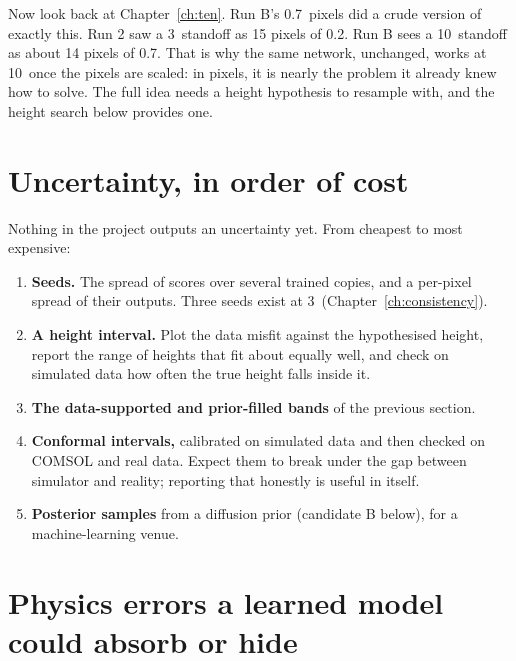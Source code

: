 Now look back at Chapter~\ref{ch:ten}. Run B's 0.7\um\ pixels did a crude version of exactly this. Run 2 saw a 3\um\
standoff as 15 pixels of 0.2\um. Run B sees a 10\um\ standoff as about 14 pixels of 0.7\um. That is why the same network,
unchanged, works at 10\um\ once the pixels are scaled: in pixels, it is nearly the problem it already knew how to solve.
The full idea needs a height hypothesis to resample with, and the height search below provides one.

\section{Uncertainty, in order of cost}

Nothing in the project outputs an uncertainty yet. From cheapest to most expensive:
\begin{enumerate}
\item \textbf{Seeds.} The spread of scores over several trained copies, and a per-pixel spread of their outputs. Three
seeds exist at 3\um\ (Chapter~\ref{ch:consistency}).
\item \textbf{A height interval.} Plot the data misfit against the hypothesised height, report the range of heights that
fit about equally well, and check on simulated data how often the true height falls inside it.
\item \textbf{The data-supported and prior-filled bands} of the previous section.
\item \textbf{Conformal intervals,} calibrated on simulated data and then checked on COMSOL and real data. Expect them to
break under the gap between simulator and reality; reporting that honestly is useful in itself.
\item \textbf{Posterior samples} from a diffusion prior (candidate B below), for a machine-learning venue.
\end{enumerate}

\section{Physics errors a learned model could absorb or hide}


